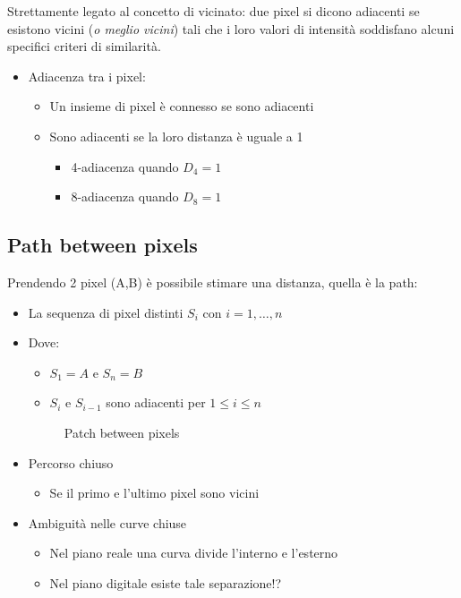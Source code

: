\documentclass{report}
\begin{document}
Strettamente legato al concetto di vicinato: due pixel si dicono
adiacenti se esistono vicini (\emph{o meglio vicini}) tali che i loro
valori di intensità soddisfano alcuni specifici criteri di similarità.
\begin{itemize}
\item Adiacenza tra i pixel:
  \begin{itemize}
  \item Un insieme di pixel è connesso se sono adiacenti
  \item Sono adiacenti se la loro distanza è uguale a 1
    \begin{itemize}
    \item 4-adiacenza quando $D_4 = 1$
    \item 8-adiacenza quando $D_8 = 1$
    \end{itemize}
  \end{itemize}
\end{itemize}

\subsection{Path between pixels}
\label{sec:pathbetpixels}

Prendendo 2 pixel (A,B) è possibile stimare una distanza, quella è la
path:
\begin{itemize}
\item La sequenza di pixel distinti $S_i$ con $i =1,\dots,n$
\item Dove:
  \begin{itemize}
  \item $S_1 = A$ e $S_n = B$
  \item $S_i$ e $S_{i-1}$ sono adiacenti per $1\leq i\leq n$
  \end{itemize}
  \begin{figure}[ht!]
    \centering
    \resizebox{14cm}{!}{
    }
    \caption{Patch between pixels}
    \label{fig:pathpix}
  \end{figure}
\item Percorso chiuso
  \begin{itemize}
  \item Se il primo e l'ultimo pixel sono vicini
  \end{itemize}
\item Ambiguità nelle curve chiuse
  \begin{itemize}
  \item Nel piano reale una curva divide l'interno e l'esterno
  \item Nel piano digitale esiste tale separazione!?
  \end{itemize}
\end{itemize}
\end{document}
